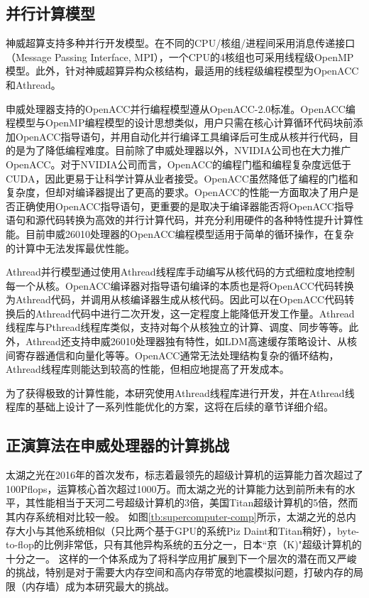 
\subsection{并行计算模型} %
\label{sub:并行计算模型}



神威超算支持多种并行开发模型。在不同的CPU/核组/进程间采用消息传递接口（Message Passing Interface, MPI），一个CPU的4核组也可采用线程级OpenMP模型。此外，针对神威超算异构众核结构，最适用的线程级编程模型为OpenACC和Athread。

申威处理器支持的OpenACC并行编程模型遵从OpenACC-2.0标准。OpenACC编程模型与OpenMP编程模型的设计思想类似，用户只需在核心计算循环代码块前添加OpenACC指导语句，并用自动化并行编译工具编译后可生成从核并行代码，目的是为了降低编程难度。目前除了申威处理器以外，NVIDIA公司也在大力推广OpenACC。对于NVIDIA公司而言，OpenACC的编程门槛和编程复杂度远低于CUDA，因此更易于让科学计算从业者接受。OpenACC虽然降低了编程的门槛和复杂度，但却对编译器提出了更高的要求。OpenACC的性能一方面取决了用户是否正确使用OpenACC指导语句，更重要的是取决于编译器能否将OpenACC指导语句和源代码转换为高效的并行计算代码，并充分利用硬件的各种特性提升计算性能。目前申威26010处理器的OpenACC编程模型适用于简单的循环操作，在复杂的计算中无法发挥最优性能。


Athread并行模型通过使用Athread线程库手动编写从核代码的方式细粒度地控制每一个从核。OpenACC编译器对指导语句编译的本质也是将OpenACC代码转换为Athread代码，并调用从核编译器生成从核代码。因此可以在OpenACC代码转换后的Athread代码中进行二次开发，这一定程度上能降低开发工作量。Athread线程库与Pthread线程库类似，支持对每个从核独立的计算、调度、同步等等。此外，Athread还支持申威26010处理器独有特性，如LDM高速缓存策略设计、从核间寄存器通信和向量化等等。OpenACC通常无法处理结构复杂的循环结构，Athread线程库则能达到较高的性能，但相应地提高了开发成本。

为了获得极致的计算性能，本研究使用Athread线程库进行开发，并在Athread线程库的基础上设计了一系列性能优化的方案，这将在后续的章节详细介绍。


\subsection{正演算法在申威处理器的计算挑战} %

太湖之光在2016年的首次发布\citep{fu2016sunway}，标志着最领先的超级计算机的运算能力首次超过了100Pflops，运算核心首次超过1000万。而太湖之光的计算能力达到前所未有的水平，其性能相当于天河二号超级计算机的3倍，美国Titan超级计算机的5倍，然而其内存系统相对比较一般。 如图\ref{tb:supercomputer-comp}所示，太湖之光的总内存大小与其他系统相似（只比两个基于GPU的系统Piz Daint和Titan稍好），byte-to-flop的比例非常低，只有其他异构系统的五分之一，日本“京（K)"超级计算机的十分之一。 这样的一个体系成为了将科学应用扩展到下一个层次的潜在而又严峻的挑战，特别是对于需要大内存空间和高内存带宽的地震模拟问题，打破内存的局限（内存墙）成为本研究最大的挑战。


